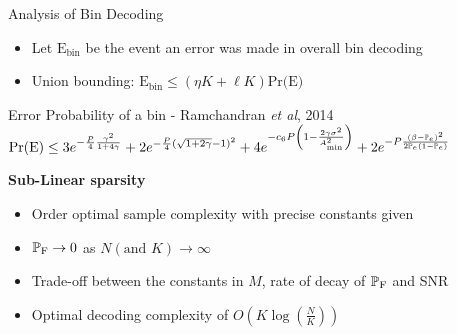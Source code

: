 \documentclass[10pt]{beamer}
\begin{document}
\begin{frame}{Analysis of Bin Decoding}
\begin{itemize}
\item Let $\text{E}_{\text{bin}}$ be the event an error was made in overall bin decoding
\item Union bounding: $\text{E}_{\text{bin}}\leq (\eta K+\ell K)\text{Pr(E)}$
\end{itemize}
\begin{block}{Error Probability of a bin - Ramchandran \textit{et al}, 2014}
$\text{Pr(E)}\leq 3e^{-\frac{P}{4}\frac{\gamma^2}{1+4 \gamma}}+2e^{-\frac{P}{4}(\sqrt{1+2\gamma}-1)^2}+4e^{-c_6 P\left(1-\frac{2\gamma\sigma^2}{A^{2}_{\text{min}}}\right)}+2e^{-P\frac{\left(\beta-\mathbb{P}_{e}\right)^2}{2\mathbb{P}_{e}(1-\mathbb{P}_{e})}}$
\end{block}
\vspace{2ex}
\begin{description}
    \item[\textbf{Sub-Linear sparsity}]
\end{description}
\begin{itemize}
\item Order optimal sample complexity with precise constants given
\item $\mathbb{P}_{\text{F}}\rightarrow 0$ as $N (\text{and } K)\rightarrow \infty$
\item Trade-off between the constants in $M$, rate of decay of  $\mathbb{P}_{\text{F}}$ and SNR
\item Optimal decoding complexity of $O\left(K\log\left(\frac{N}{K}\right)\right)$
\end{itemize}

\end{frame}
\end{document}
